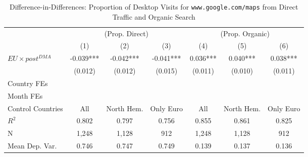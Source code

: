 \documentclass[11pt]{article}
\begin{document}
	
	\begin{table}[!ht]
		\centering
		\def\sym#1{\ifmmode^{#1}\else\(^{#1}\)\fi}
		\caption{\label{tab:did_proportion} Difference-in-Differences: Proportion of Desktop Visits for \texttt{www.google.com/maps} from Direct Traffic and Organic Search}
		\begin{threeparttable}
			\begin{tabular}{lcccccc}
				\hline \noalign{\smallskip} 
				& \multicolumn{3}{c}{(Prop. Direct)} & \multicolumn{3}{c}{(Prop. Organic)}  \\ \cmidrule(lr){2-4}\cmidrule(lr){5-7}
				
				&         (1)   &         (2)   &         (3)   &         (4)   &         (5)   &         (6)   \\
				\midrule
				$ EU \times post^{DMA} $ &      -0.039***&      -0.042***&      -0.041***&       0.036***&       0.040***&       0.038***\\
				&     (0.012)   &     (0.012)   &     (0.015)   &     (0.011)   &     (0.010)   &     (0.011)   \\
				
				Country FEs         &  \checkmark   &  \checkmark   &  \checkmark   &  \checkmark   &  \checkmark   &  \checkmark   \\
				Month FEs           &  \checkmark   &  \checkmark   &  \checkmark   &  \checkmark   &  \checkmark   &  \checkmark   \\
				Control Countries   &         All   &  North Hem.   &   Only Euro   &         All   &  North Hem.   &   Only Euro   \\
				$ R ^2 $            &       0.802   &       0.797   &       0.756   &       0.855   &       0.861   &       0.825   \\
				N                   &       1,248   &       1,128   &         912   &       1,248   &       1,128   &         912   \\
				Mean Dep. Var.      &       0.746   &       0.747   &       0.749   &       0.139   &       0.137   &       0.136   \\
				\midrule
				
			\end{tabular}
			

\end{threeparttable}
\end{table}
\end{document}
